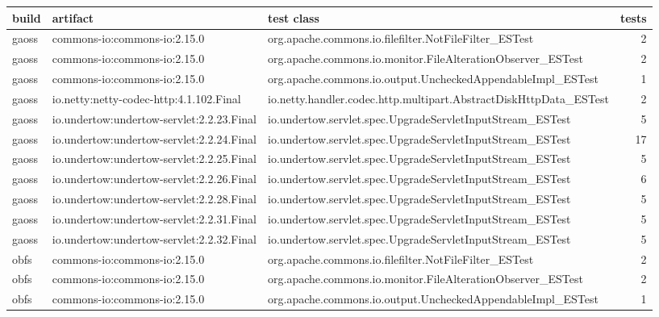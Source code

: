 \begin{tabular}{p{0.5cm}p{5cm}p{7.5cm}r} 
\toprule 
\textbf{build} & \textbf{artifact} & \textbf{test class} & \textbf{tests} \\ \midrule
gaoss & commons-io:commons-io:2.15.0 & org.apache.commons.io.filefilter.NotFileFilter\_ESTest & 2 \\
gaoss & commons-io:commons-io:2.15.0 & org.apache.commons.io.monitor.FileAlterationObserver\_ESTest & 2 \\
gaoss & commons-io:commons-io:2.15.0 & org.apache.commons.io.output.UncheckedAppendableImpl\_ESTest & 1 \\
gaoss & io.netty:netty-codec-http:4.1.102.Final & io.netty.handler.codec.http.multipart.AbstractDiskHttpData\_ESTest & 2 \\
gaoss & io.undertow:undertow-servlet:2.2.23.Final & io.undertow.servlet.spec.UpgradeServletInputStream\_ESTest & 5 \\
gaoss & io.undertow:undertow-servlet:2.2.24.Final & io.undertow.servlet.spec.UpgradeServletInputStream\_ESTest & 17 \\
gaoss & io.undertow:undertow-servlet:2.2.25.Final & io.undertow.servlet.spec.UpgradeServletInputStream\_ESTest & 5 \\
gaoss & io.undertow:undertow-servlet:2.2.26.Final & io.undertow.servlet.spec.UpgradeServletInputStream\_ESTest & 6 \\
gaoss & io.undertow:undertow-servlet:2.2.28.Final & io.undertow.servlet.spec.UpgradeServletInputStream\_ESTest & 5 \\
gaoss & io.undertow:undertow-servlet:2.2.31.Final & io.undertow.servlet.spec.UpgradeServletInputStream\_ESTest & 5 \\
gaoss & io.undertow:undertow-servlet:2.2.32.Final & io.undertow.servlet.spec.UpgradeServletInputStream\_ESTest & 5 \\
obfs & commons-io:commons-io:2.15.0 & org.apache.commons.io.filefilter.NotFileFilter\_ESTest & 2 \\
obfs & commons-io:commons-io:2.15.0 & org.apache.commons.io.monitor.FileAlterationObserver\_ESTest & 2 \\
obfs & commons-io:commons-io:2.15.0 & org.apache.commons.io.output.UncheckedAppendableImpl\_ESTest & 1 \\
 \bottomrule \end{tabular}
